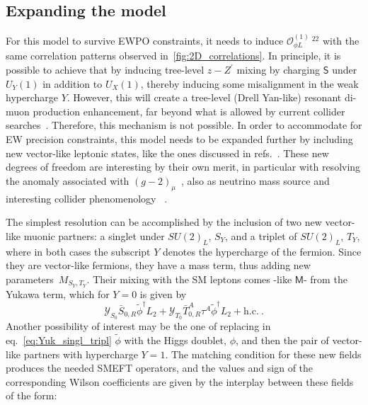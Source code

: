 \subsection{Expanding the model}
\par For this model to survive EWPO constraints, it needs to induce  $\mathcal O_{\phi L}^{(1)}\ ^{22}$ with the same correlation patterns observed in~\autoref{fig:2D_correlations}.  In principle, it is possible to achieve that by inducing tree-level $z-Z^\prime$ mixing by charging $\mathsf{S}$ under $U_Y(1)$ in addition to $U_X(1)$, thereby inducing some misalignment in the weak hypercharge $Y$. However, this will create a tree-level (Drell Yan-like) resonant di-muon production enhancement, far beyond what is allowed by current collider searches~\cite{ATLAS-CONF-2019-001}.  Therefore, this mechanism is not possible. In order to accommodate for EW precision constraints, this model needs to be expanded further by including new vector-like leptonic states, like the ones discussed in refs.~\cite{Thomas:1998wy,delAguila:2008pw}. These new degrees of freedom are interesting by their own merit, in particular with resolving the anomaly associated with $(g-2)_{\mu}$~\cite{Kannike:2011ng,Muong-2:2021ojo}, also as neutrino mass source and interesting collider phenomenology ~\cite{Kumar:2015tna,Bhattiprolu:2019vdu}.
\par The simplest resolution can be accomplished by the inclusion of  two new vector-like muonic partners: a singlet under $SU(2)_{L}$, $S_{Y}$, and a triplet of $SU(2)_{L}$, $T_{Y}$, where in both cases the subscript $Y$ denotes the hypercharge of the fermion. Since they are vector-like fermions, they have a mass term, thus adding new parameters~$M_{S_{Y},T_{Y}}$. Their mixing with the SM leptons comes -like $\mathsf{M}$- from the Yukawa term, which for $Y=0$ is given by
\begin{equation}
	\label{eq:Yuk_singl_tripl}
	\mathcal{Y}_{S_{0}} \bar{S}_{0,R} \tilde{\phi}^{\dagger} L_{2} + \mathcal{Y}_{T_{0}} \bar{T}^{A}_{0,R} \tau^{A} \tilde{\phi}^{\dagger} L_{2} + \textrm{h.c.}  \ .
\end{equation} 
Another possibility of interest may be the one of replacing in eq.~\eqref{eq:Yuk_singl_tripl} $\tilde{\phi} $
with the Higgs doublet, $\phi$, and then the pair of vector-like partners with hypercharge $Y=1$.  The matching condition for these new fields produces the needed SMEFT operators, and the values and sign of the corresponding Wilson coefficients are given by the interplay between these fields ~\cite{delAguila:2008pw,Kannike:2011ng} of the form:
